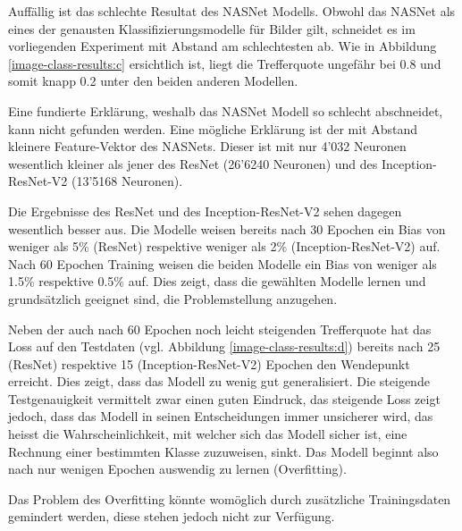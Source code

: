 
Auffällig ist das schlechte Resultat des NASNet Modells. Obwohl das NASNet als eines der genausten Klassifizierungsmodelle für Bilder gilt, schneidet es im vorliegenden Experiment mit Abstand am schlechtesten ab. Wie in Abbildung \ref{image-class-results:c} ersichtlich ist, liegt die Trefferquote ungefähr bei 0.8 und somit knapp 0.2 unter den beiden anderen Modellen.

Eine fundierte Erklärung, weshalb das NASNet Modell so schlecht abschneidet, kann nicht gefunden werden. Eine mögliche Erklärung ist der mit Abstand kleinere Feature-Vektor des NASNets. Dieser ist mit nur 4'032 Neuronen wesentlich kleiner als jener des ResNet (26'6240 Neuronen) und des Inception-ResNet-V2 (13'5168 Neuronen).

Die Ergebnisse des ResNet und des Inception-ResNet-V2 sehen dagegen wesentlich besser aus. Die Modelle weisen bereits nach 30 Epochen ein Bias von weniger als 5\% (ResNet) respektive weniger als 2\% (Inception-ResNet-V2) auf. Nach 60 Epochen Training weisen die beiden Modelle ein Bias von weniger als 1.5\% respektive 0.5\% auf. Dies zeigt, dass die gewählten Modelle lernen und grundsätzlich geeignet sind, die Problemstellung anzugehen. 

Neben der auch nach 60 Epochen noch leicht steigenden Trefferquote hat das Loss auf den Testdaten (vgl. Abbildung \ref{image-class-results:d}) bereits nach 25 (ResNet) respektive 15 (Inception-ResNet-V2) Epochen den Wendepunkt erreicht. Dies zeigt, dass das Modell zu wenig gut generalisiert. Die steigende Testgenauigkeit vermittelt zwar einen guten Eindruck, das steigende Loss zeigt jedoch, dass das Modell in seinen Entscheidungen immer unsicherer wird, das heisst die Wahrscheinlichkeit, mit welcher sich das Modell sicher ist, eine Rechnung einer bestimmten Klasse zuzuweisen, sinkt. Das Modell beginnt also nach nur wenigen Epochen auswendig zu lernen (Overfitting).

Das Problem des Overfitting könnte womöglich durch zusätzliche Trainingsdaten gemindert werden, diese stehen jedoch nicht zur Verfügung.







